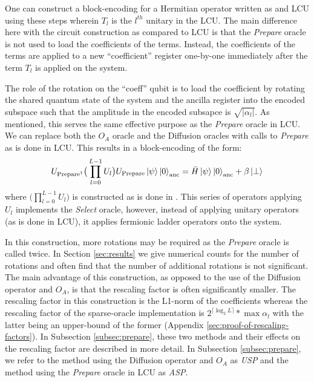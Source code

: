 One can construct a block-encoding for a Hermitian operator written as and LCU using these steps wherein $T_l$ is the $l^{th}$ unitary in the LCU.
The main difference here with the circuit construction as compared to LCU is that the \textit{Prepare} oracle is not used to load the coefficients of the terms.
Instead, the coefficients of the terms are applied to a new ``coefficient'' register one-by-one immediately after the term $T_l$ is applied on the system.

The role of the rotation on the ``coeff'' qubit is to load the coefficient by rotating the shared quantum state of the system and the ancilla register into the encoded subspace such that the amplitude in the encoded subsapce is $\sqrt{| \alpha_l |}$.
As mentioned, this serves the same effective purpose as the \textit{Prepare} oracle in LCU.
We can replace both the $O_A$ oracle and the Diffusion oracles with calls to \textit{Prepare} as is done in LCU.
This results in a block-encoding of the form:
\begin{equation}
    U_{\text{Prepare}^\dagger} \big( \prod_{l=0}^{L-1} U_l \big) U_{\text{Prepare}} \ket{\psi} \ket{0}_{\text{anc}} = \bar{H} \ket{\psi} \ket{0}_{\text{anc}} + \beta \ket{\perp}
\end{equation}
where $\big( \prod_{l=0}^{L-1} U_l \big)$ is constructed as is done in \cite{camps2024explicit,liu2024efficient}.
This series of operators applying $U_l$ implements the \textit{Select} oracle, however, instead of applying unitary operators (as is done in LCU), it applies fermionic ladder operators onto the system.

In this construction, more rotations may be required as the \textit{Prepare} oracle is called twice.
In Section \ref{sec:results} we give numerical counts for the number of rotations and often find that the number of additional rotations is not significant.
The main advantage of this construction, as opposed to the use of the Diffusion operator and $O_A$, is that the rescaling factor is often significantly smaller.
The rescaling factor in this construction is the L1-norm of the coefficients whereas the rescaling factor of the sparse-oracle implementation is $2^{\lceil \log_2{L} \rceil} * \max{\alpha_l}$ with the latter being an upper-bound of the former (Appendix \ref{sec:proof-of-rescaling-factors}).
In Subsection \ref{subsec:prepare}, these two methods and their effects on the rescaling factor are described in more detail.
In Subsection \ref{subsec:prepare}, we refer to the method using the Diffusion operator and $O_A$ as \textit{USP} and the method using the \textit{Prepare} oracle in LCU as \textit{ASP}.

